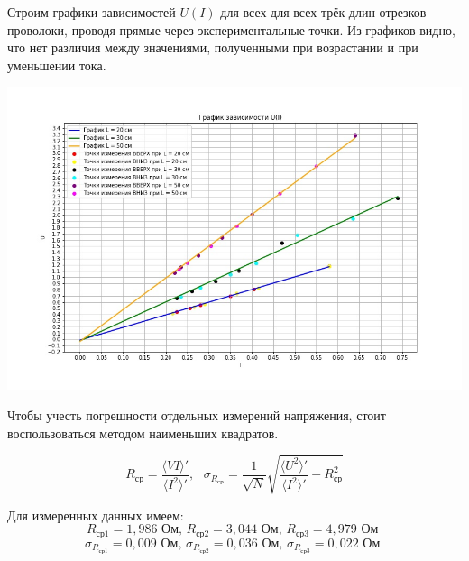 Строим графики зависимостей $U(I)$ для всех для всех трёк длин отрезков проволоки, проводя прямые через экспериментальные точки. Из графиков видно, что нет различия между значениями, полученными при возрастании и при уменьшении тока.

\begin{center}
    {\includegraphics[width=14cm]{schedule}}
\end{center}


Чтобы учесть погрешности отдельных измерений напряжения, стоит воспользоваться методом наименьших квадратов.

\[R_{\text{ср}} = \frac{\langle VI \rangle '}{\langle I^2 \rangle '}, \text{ } \sigma_{R_{\text{ср}}} = \frac{1}{\sqrt{N}} \sqrt{\frac{\langle U^2 \rangle '}{\langle I^2 \rangle '} - R^2_{\text{ср}}}\]

Для измеренных данных имеем:
\[R_{\text{ср}1} = 1,986 \text{ Ом, }R_{\text{ср}2} = 3,044\text{ Ом, }R_{\text{ср}3} = 4,979\text{ Ом }\]
\[\sigma_{R_{\text{ср}1}} = 0,009 \text{ Ом, }\sigma_{R_{\text{ср}2}} = 0,036\text{ Ом, }\sigma_{R_{\text{ср}3}} = 0,022\text{ Ом }\]

